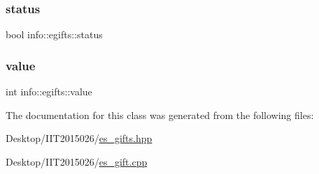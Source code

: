 \subsubsection{\texorpdfstring{status}{status}}
{\footnotesize\ttfamily bool info\+::egifts\+::status\hspace{0.3cm}{\ttfamily [private]}}

\mbox{\label{classinfo_1_1egifts_a4bbef1ffe342b5a5ee91586f758d55fd}} 
\subsubsection{\texorpdfstring{value}{value}}
{\footnotesize\ttfamily int info\+::egifts\+::value\hspace{0.3cm}{\ttfamily [private]}}



The documentation for this class was generated from the following files\+:\begin{DoxyCompactItemize}
\item 
Desktop/\+I\+I\+T2015026/\hyperlink{es__gifts_8hpp}{es\+\_\+gifts.\+hpp}\item 
Desktop/\+I\+I\+T2015026/\hyperlink{es__gift_8cpp}{es\+\_\+gift.\+cpp}\end{DoxyCompactItemize}
